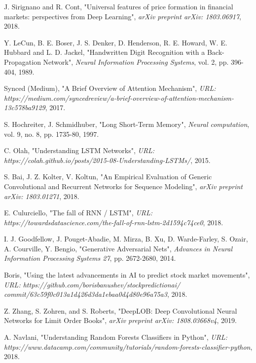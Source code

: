 \documentclass[11pt,a4paper,oneside]{article}
\begin{document}
\begin{references}{9}
   J. Sirignano and R. Cont, "Universal features of price formation in financial markets: perspectives from Deep Learning",  
  \textit{arXiv preprint arXiv: 1803.06917}, 2018.

   Y. LeCun, B. E. Boser, J. S. Denker, D. Henderson, R. E. Howard, W. E. Hubbard and L. D. Jackel, "Handwritten Digit Recognition with a Back-Propagation Network", 
  \textit{Neural Information Processing Systems}, vol. 2, pp. 396-404, 1989. 

   Synced (Medium), "A Brief Overview of Attention Mechanism", 
  \textit{URL: https://medium.com/syncedreview/a-brief-overview-of-attention-mechanism-13c578ba9129}, 2017.

   S. Hochreiter, J. Schmidhuber, "Long Short-Term Memory", 
  \textit{Neural computation}, vol. 9, no. 8, pp. 1735-80, 1997.

   C. Olah, "Understanding LSTM Networks", 
  \textit{URL: https://colah.github.io/posts/2015-08-Understanding-LSTMs/}, 2015.

   S. Bai, J. Z. Kolter, V. Koltun, "An Empirical Evaluation of Generic Convolutional and Recurrent Networks for Sequence Modeling",  
  \textit{arXiv preprint arXiv: 1803.01271}, 2018.
  
   E. Culurciello, "The fall of RNN / LSTM", 
  \textit{URL: https://towardsdatascience.com/the-fall-of-rnn-lstm-2d1594c74ce0}, 2018.

   I. J. Goodfellow, J. Pouget-Abadie, M. Mirza, B. Xu, D. Warde-Farley, S. Ozair, A. Courville, Y. Bengio, "Generative Adversarial Nets",  
  \textit{Advances in Neural Information Processing Systems 27}, pp. 2672-2680, 2014.

   Boris, "Using the latest advancements in AI to predict stock market movements", 
  \textit{URL: https://github.com/borisbanushev/stockpredictionai/\\commit/63c59f0c013a1d426d3da1ebaa0d4d80e96a75a3}, 2018.

   Z. Zhang, S. Zohren, and S. Roberts, "DeepLOB: Deep Convolutional Neural Networks for Limit Order Books",  
  \textit{arXiv preprint arXiv: 1808.03668v4}, 2019.

   A. Navlani, "Understanding Random Forests Classifiers in Python", 
  \textit{URL: https://www.datacamp.com/community/tutorials/random-forests-classifier-python}, 2018. 

\end{references}
\end{document}
